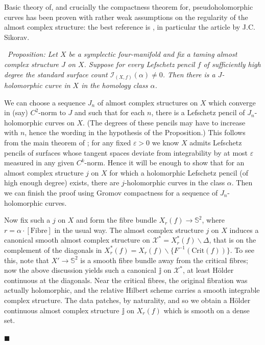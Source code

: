 \documentclass[10pt]{article}
\newcommand{\sss}{\mathbb{S}}
\newcommand{\Crit}{\mathrm{Crit}}
\newcommand{\Fibre}{\mathrm{Fibre}}
\newcounter{Universal}[section]
\renewcommand{\theUniversal}{\thesection.\arabic{Universal}}
\newenvironment{Italic}{\refstepcounter{Universal} \par \vspace{0.5cm}
\noindent {\bf (\theUniversal)}\ \it}{\par \vspace{0.5cm}}
\newenvironment{Prop}{\begin{Italic}{\sc Proposition:} }{\end{Italic}}
\newenvironment{Pf}{\par \noindent{\sc Proof:} }{\quad $\blacksquare$ \par
\vspace{0.5cm}}
\begin{document}
Basic theory of, and crucially the compactness theorem for,
pseudoholomorphic curves has been proven with rather weak assumptions
on the regularity of the almost complex structure: the best reference
is \cite{AudLaf:eds}, in particular the article by J.C. Sikorav.

\begin{Prop}
Let $X$ be a symplectic four-manifold and fix a taming almost
complex structure $J$ on $X$.  Suppose for every Lefschetz
pencil $f$ of sufficiently high degree the standard surface count
$\mathcal{I}_{(X,f)}(\alpha) \neq 0$.  Then there is a $J$-holomorphic
curve in $X$ in the homology class $\alpha$.
\end{Prop}

\begin{Pf}
We can choose a sequence $J_n$ of almost complex structures on $X$
which converge in (say) $C^2$-norm to $J$ and such that for each
$n$, there is a Lefschetz pencil of $J_n$-holomorphic curves on
$X$.  (The degrees of these pencils may have to increase with $n$,
hence the wording in the hypothesis of the Proposition.)
This follows from the main theorem of \cite{Donaldson:submflds}; for any fixed
$\varepsilon > 0$ we know $X$ admits Lefschetz pencils of surfaces
whose tangent spaces deviate from integrability by at most
$\varepsilon$ measured in any given $C^k$-norm.  Hence it will be
enough to show that for an almost complex structure $j$ on $X$ for which a
holomorphic Lefschetz pencil (of high enough degree) exists, there are
$j$-holomorphic curves in the class $\alpha$.  Then we can finish the
proof using Gromov compactness for a sequence of $J_n$-holomorphic curves.

\vspace{0.2cm}

\noindent Now fix such a $j$ on $X$ and form the fibre bundle $X_r(f)
\rightarrow \sss^2$, where $r = \alpha\cdot[\Fibre]$ in the usual
way.  The almost complex structure $j$ on $X$ induces a
canonical smooth almost complex structure on $\mathcal{X}^* =
X^*_r(f)\backslash\Delta$, 
that is on the complement of the diagonals in $X^*_r(f) =
X_r(f) \backslash \{F^{-1}(\Crit(f))\}$.  To see this,
note that $X' \rightarrow \sss^2$ is a smooth fibre bundle away from
the critical fibres; now the above discussion 
yields such a canonical $\mathbb{j}$ on  $\mathcal{X}^*$, at least
H\"older continuous at the diagonals. Near the critical fibres, the
original fibration was actually holomorphic, and the relative Hilbert
scheme carries a smooth integrable complex structure. The data
patches, by naturality, and so we obtain a H\"older continuous almost
complex structure $\mathbb{j}$ on $X_r(f)$ which is smooth on a
dense set.


\end{Pf}
\end{document}
